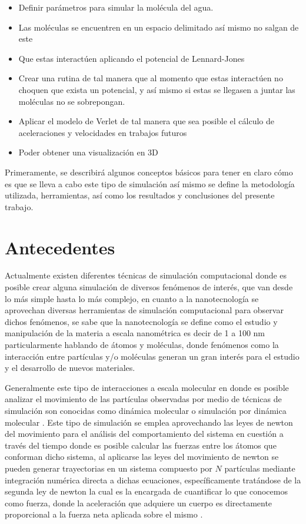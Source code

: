 \documentclass[3pt,twocolumn]{elsarticle}
\begin{document}
\begin{itemize}
\item Definir parámetros para simular la molécula del agua.
\item Las moléculas se encuentren en un espacio delimitado así mismo no salgan de este
\item Que estas interactúen aplicando el potencial de Lennard-Jones
\item Crear una rutina de tal manera que al momento que estas interactúen no choquen que exista un potencial, y así mismo si estas se llegasen a juntar las moléculas no se sobrepongan.
\item Aplicar el modelo de Verlet de tal manera que sea posible el cálculo de aceleraciones y velocidades en trabajos futuros
\item Poder obtener una visualización en 3D
\end{itemize}

Primeramente, se describirá algunos conceptos básicos para tener en claro cómo es que se lleva a cabo este tipo de simulación así mismo se define la metodología utilizada, herramientas, así como los resultados y conclusiones del presente trabajo.


\section{Antecedentes}\label{antesc}

Actualmente existen diferentes técnicas de simulación computacional donde es posible crear alguna simulación de diversos fenómenos de interés, que van desde lo más simple hasta lo más complejo, en cuanto a la nanotecnología se aprovechan diversas herramientas de simulación computacional para observar dichos fenómenos, se sabe que la nanotecnología se define \cite{nano} como el estudio y manipulación de la materia a escala nanométrica es decir de 1 a 100 nm particularmente hablando de átomos y moléculas, donde fenómenos como la interacción entre partículas y/o moléculas generan un gran interés para el estudio y el desarrollo de nuevos materiales.

Generalmente este tipo de interacciones a escala molecular en donde es posible analizar el movimiento de las partículas observadas por medio de técnicas de simulación son conocidas como dinámica molecular o simulación por dinámica molecular \cite{Dm, DMA}. Este tipo de simulación se emplea aprovechando las leyes de newton del movimiento para el análisis del comportamiento del sistema en cuestión a través del tiempo donde es posible calcular las fuerzas entre los átomos que conforman dicho sistema, al aplicarse las leyes del movimiento de newton se pueden generar trayectorias en un sistema compuesto por $N$ partículas mediante integración numérica directa a dichas ecuaciones, específicamente tratándose de la segunda ley de newton la cual es la encargada de cuantificar lo que conocemos como fuerza, donde la aceleración que adquiere un cuerpo es directamente proporcional a la fuerza neta aplicada sobre el mismo \cite{new, Dm}.
\end{document}
